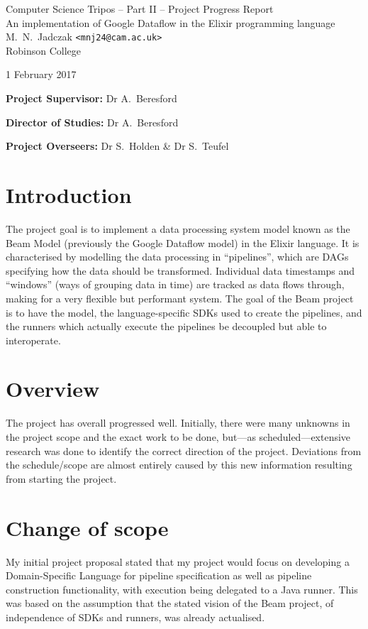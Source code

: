 \documentclass[11pt]{scrartcl}
\begin{document}
\begin{center}
\Large
Computer Science Tripos -- Part II -- Project Progress Report\\[4mm]
\LARGE
An implementation of Google Dataflow in the Elixir programming language\\[4mm]

\large
M.~N.~Jadczak \texttt{<mnj24@cam.ac.uk>}\\Robinson College

1 February 2017
\end{center}

\vspace{5mm}

\textbf{Project Supervisor:} Dr A.~Beresford

\textbf{Director of Studies:} Dr A.~Beresford

\textbf{Project Overseers:} Dr S.~Holden  \& Dr S.~Teufel


\section*{Introduction}
The project goal is to implement a data processing system model known as the Beam Model (previously the Google Dataflow model) in the Elixir language. It is characterised by modelling the data processing in ``pipelines'', which are DAGs specifying how the data should be transformed. Individual data timestamps and ``windows'' (ways of grouping data in time) are tracked as data flows through, making for a very flexible but performant system. The goal of the Beam project is to have the model, the language-specific SDKs used to create the pipelines, and the runners which actually execute the pipelines be decoupled but able to interoperate.

\section*{Overview}
The project has overall progressed well. Initially, there were many unknowns in the project scope and the exact work to be done, but---as scheduled---extensive research was done to identify the correct direction of the project. Deviations from the schedule/scope are almost entirely caused by this new information resulting from starting the project.

\section*{Change of scope}
My initial project proposal stated that my project would focus on developing a Domain-Specific Language for pipeline specification as well as pipeline construction functionality, with execution being delegated to a Java runner. This was based on the assumption that the stated vision of the Beam project, of independence of SDKs and runners, was already actualised.
\end{document}
